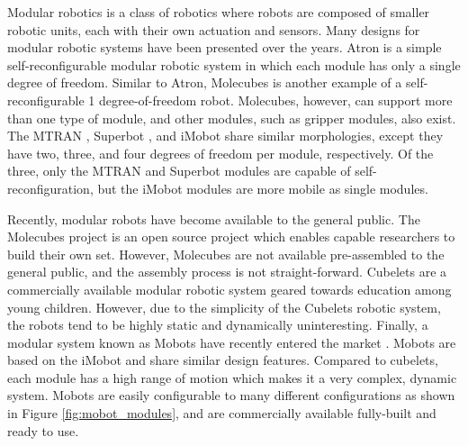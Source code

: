     Modular robotics is a class of robotics where robots are composed of smaller
      robotic units, each with their own actuation and sensors. 
    Many designs for modular robotic systems have been presented over the years. 
    Atron \cite{Jorgensen2004, Christensen2006} is a simple self-reconfigurable
      modular robotic system in which each module has only a single degree of
      freedom.
    Similar to Atron, Molecubes \cite{Zykov2007} is another example of a
    self-reconfigurable 1 degree-of-freedom robot. 
    Molecubes, however, can support more than one type of module, and other
      modules, such as gripper modules, also exist. 
    The MTRAN \cite{Murata2002}, Superbot \cite{Shen2006, Salemi2006}, and iMobot
      \cite{Ryland2010} share similar morphologies, except they have two, three, and
      four degrees of freedom per module, respectively. 
    Of the three, only the MTRAN and Superbot modules are capable of
      self-reconfiguration, but the iMobot modules are more mobile as single
      modules. 

    Recently, modular robots have become available to the general public. 
    The Molecubes project is an open source project which enables capable researchers
      to build their own set. 
    However, Molecubes are not available pre-assembled to the general public,
      and the assembly process is not straight-forward. 
    Cubelets \cite{cubelets_website} are a commercially available modular robotic system
      geared towards education among young children. 
    However, due to the simplicity of the Cubelets robotic system, the robots
      tend to be highly static and dynamically uninteresting. 
    Finally, a modular system known as Mobots have recently entered the market
    \cite{barobo_website}. Mobots are based on the
      iMobot\cite{Ryland2010} and share similar design features. 
    Compared to cubelets, each module has a high range of motion which makes it
      a very complex, dynamic system. 
    Mobots are easily configurable to many different configurations as shown in
      Figure \ref{fig:mobot_modules}, and are commercially available
      fully-built and ready to use.


